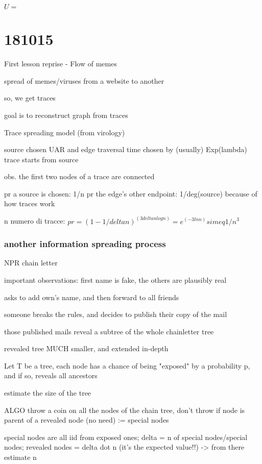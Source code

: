 \documentclass{report}
\begin{document}
	$ U = {}$
	
	
	\chapter{181015}
	
	First lesson reprise - Flow of memes
	
	spread of memes/viruses from a website to another
	
	so, we get traces
	
	goal is to reconstruct graph from traces
	
	Trace spreading model (from virology)
	
	source chosen UAR and edge traversal time chosen by (usually) Exp(lambda)
	trace starts from source
	
	obs. the first two nodes of a trace are connected
	
	pr a source is chosen: 1/n
	pr the edge's other endpoint: 1/deg(source) because of how traces work
	
	n numero di tracce: $pr = (1-1/deltan)^(3deltanlogn) = e^(-3lnn) simeq 1/n^3$
	
	
	\subsection{another information spreading process}
	
	NPR chain letter
	
	important observations: first name is fake, the others are plausibly real
	
	asks to add own's name, and then forward to all friends
	
	
	someone breaks the rules, and decides to publish their copy of the mail
	
	those published mails reveal a subtree of the whole chainletter tree
	
	revealed tree MUCH smaller, and extended in-depth
	
	
	Let T be a tree, each node has a chance of being "exposed" by a probability p, and if so, reveals all ancestors
	
	estimate the size of the tree
	
	ALGO
	throw a coin on all the nodes of the chain tree, don't throw if node is parent of a revealed node (no need) := special nodes
	
	special nodes are all iid from exposed ones; delta = n of special nodes/special nodes; revealed nodes = delta dot n (it's the expected value!!) -> from there estimate n
	
\end{document}
